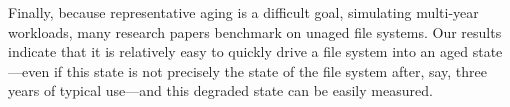 Finally, because representative aging is a difficult goal, simulating multi-year workloads,
many research 
papers benchmark on unaged file systems.
Our results indicate that it is relatively easy to quickly drive
a file system into an aged state---even if
this state is not precisely the state of the file system after, say, three
years of typical use---and this degraded state can be easily 
measured.



